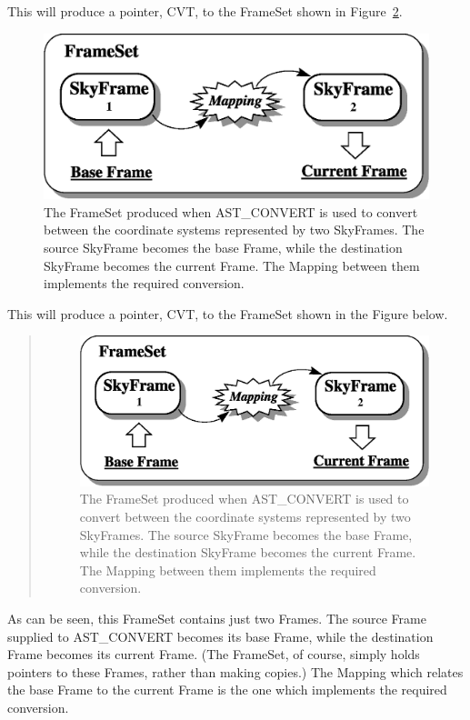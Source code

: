 \documentclass[twoside,11pt]{article}
\newenvironment{latexonly}{}{}
\newcommand{\htmlref}[2]{#1}
\begin{document}
\begin{latexonly}
   This will produce a pointer, CVT, to the FrameSet shown in
   Figure~\ref{fig:fsconvert}.
   \begin{figure}[bhtp]
   \begin{center}
   \includegraphics[scale=0.65]{sun210_figures/fsconvert.eps}
   \caption{The FrameSet produced when AST\_CONVERT is used to convert
   between the coordinate systems represented by two SkyFrames. The
   source \htmlref{SkyFrame}{SkyFrame} becomes the base Frame, while the destination SkyFrame
   becomes the current Frame. The \htmlref{Mapping}{Mapping} between them implements the
   required conversion.}
   \label{fig:fsconvert}
   \end{center}
   \end{figure}
\end{latexonly}
\begin{htmlonly}
   This will produce a pointer, CVT, to the FrameSet shown in the Figure
   below.
   \begin{quote}
   \begin{figure}[bhtp]
   \label{fig:fsconvert}
   \includegraphics[scale=1.0]{sun210_figures/fsconvert.eps}
   \caption{The FrameSet produced when AST\_CONVERT is used to convert
   between the coordinate systems represented by two SkyFrames. The
   source SkyFrame becomes the base Frame, while the destination SkyFrame
   becomes the current Frame. The Mapping between them implements the
   required conversion.}
   \end{figure}
   \end{quote}
\end{htmlonly}
As can be seen, this FrameSet contains just two Frames.  The source
Frame supplied to AST\_CONVERT becomes its base Frame, while the
destination Frame becomes its current Frame. (The FrameSet, of course,
simply holds pointers to these Frames, rather than making copies.) The
Mapping which relates the base Frame to the current Frame is the one
which implements the required conversion.
\end{document}

